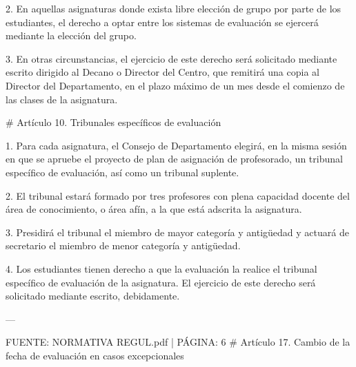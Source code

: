 \documentclass{article}
\begin{document}
\begin{itemize}
\begin{itemize}
\begin{scriptsize}
                  2. En aquellas asignaturas donde exista libre elección de grupo por parte de los estudiantes, el derecho a optar entre los sistemas de evaluación se ejercerá mediante la elección del grupo.

                  3. En otras circunstancias, el ejercicio de este derecho será solicitado mediante escrito dirigido al Decano o Director del Centro, que remitirá una copia al Director del Departamento, en el plazo máximo de un mes desde el comienzo de las clases de la asignatura.

                  \# Artículo 10. Tribunales específicos de evaluación

                  1. Para cada asignatura, el Consejo de Departamento elegirá, en la misma sesión en que se apruebe el proyecto de plan de asignación de profesorado, un tribunal específico de evaluación, así como un tribunal suplente.

                  2. El tribunal estará formado por tres profesores con plena capacidad docente del área de conocimiento, o área afín, a la que está adscrita la asignatura.

                  3. Presidirá el tribunal el miembro de mayor categoría y antigüedad y actuará de secretario el miembro de menor categoría y antigüedad.

                  4. Los estudiantes tienen derecho a que la evaluación la realice el tribunal específico de evaluación de la asignatura. El ejercicio de este derecho será solicitado mediante escrito, debidamente.

                  ---

                  FUENTE: NORMATIVA REGUL.pdf | PÁGINA: 6
                  \# Artículo 17. Cambio de la fecha de evaluación en casos excepcionales


\end{scriptsize}
\end{itemize}
\end{itemize}
\end{document}
